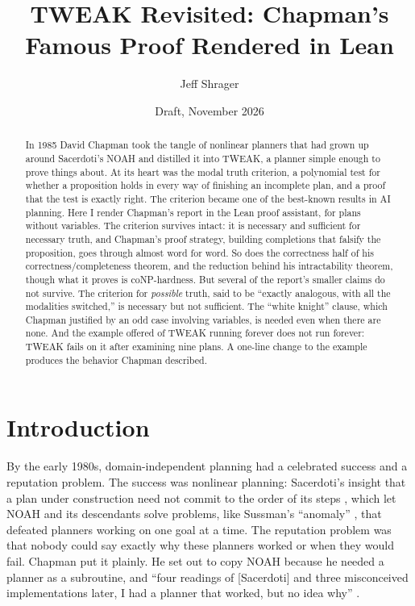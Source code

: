 \documentclass[11pt]{article}
\title{TWEAK Revisited: Chapman's Famous Proof Rendered in Lean}
\author{Jeff Shrager}
\date{Draft, November 2026}
\begin{document}
\sloppy
\maketitle

\begin{center}
\end{center}
\medskip

\begin{abstract}
In 1985 David Chapman took the tangle of nonlinear planners that had grown
up around Sacerdoti's NOAH and distilled it into TWEAK, a planner simple
enough to prove things about. At its heart was the modal truth criterion,
a polynomial test for whether a proposition holds in every way of finishing
an incomplete plan, and a proof that the test is exactly right. The
criterion became one of the best-known results in AI planning. Here I
render Chapman's report in the Lean proof assistant, for plans without
variables. The criterion survives intact: it is necessary and sufficient
for necessary truth, and Chapman's proof strategy, building completions
that falsify the proposition, goes through almost word for word. So does
the correctness half of his correctness/completeness theorem, and the
reduction behind his intractability theorem, though what it proves is
coNP-hardness. But several of the report's smaller claims do not survive.
The criterion for \emph{possible} truth, said to be ``exactly analogous,
with all the modalities switched,'' is necessary but not sufficient. The
``white knight'' clause, which Chapman justified by an odd case involving
variables, is needed even when there are none. And the example offered of
TWEAK running forever does not run forever: TWEAK fails on it after
examining nine plans. A one-line change to the example produces the
behavior Chapman described.
\end{abstract}

\section{Introduction}
\label{sec:intro}

By the early 1980s, domain-independent planning had a celebrated success
and a reputation problem. The success was nonlinear planning: Sacerdoti's
insight that a plan under construction need not commit to the order of its
steps \citep{sacerdoti1977}, which let NOAH and its descendants solve
problems, like Sussman's ``anomaly'' \citep{sussman1975}, that defeated
planners working on one goal at a time. The reputation problem was that
nobody could say exactly why these planners worked or when they would
fail. Chapman put it plainly. He set out to copy NOAH because he needed a
planner as a subroutine, and ``four readings of [Sacerdoti] and three
misconceived implementations later, I had a planner that worked, but no
idea why'' \citep[p.~1]{chapman1985}.
\end{document}
